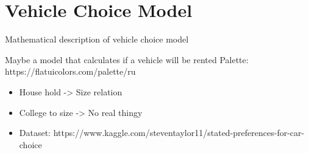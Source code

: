 \clearpage
\section{Vehicle Choice Model}
\label{sec:ChoiceModel}

Mathematical description of vehicle choice model

Maybe a model that calculates if a vehicle will be rented
Palette: https://flatuicolors.com/palette/ru
\begin{itemize}
  \item House hold -> Size relation
  \item College to size -> No real thingy
  \item Dataset: https://www.kaggle.com/steventaylor11/stated-preferences-for-car-choice
\end{itemize}